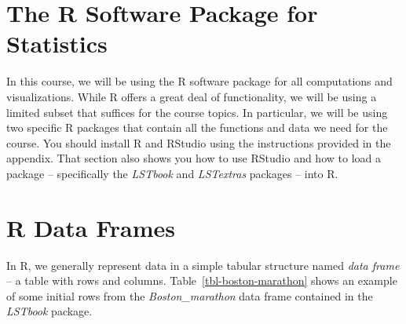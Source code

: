 \documentclass[
  12pt,
  letterpaper,
  DIV=11,
  numbers=noendperiod]{scrreprt}
\begin{document}
\section{The R Software Package for
Statistics}\label{the-r-software-package-for-statistics}

In this course, we will be using the R software package for all
computations and visualizations. While R offers a great deal of
functionality, we will be using a limited subset that suffices for the
course topics. In particular, we will be using two specific R packages
that contain all the functions and data we need for the course. You
should install R and RStudio using the instructions provided in the
appendix. That section also shows you how to use RStudio and how to load
a package -- specifically the \emph{LSTbook} and \emph{LSTextras}
packages -- into R.

\section{R Data Frames}\label{r-data-frames}

In R, we generally represent data in a simple tabular structure named
\emph{data frame} -- a table with rows and columns.
Table~\ref{tbl-boston-marathon} shows an example of some initial rows
from the \emph{Boston\_marathon} data frame contained in the
\emph{LSTbook} package.
\end{document}
